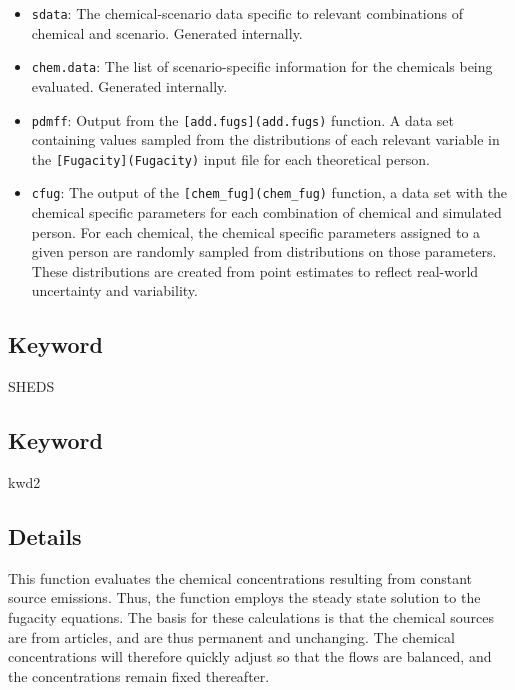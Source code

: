 \documentclass[
]{article}
\providecommand{\tightlist}{%
  \setlength{\itemsep}{0pt}\setlength{\parskip}{0pt}}
\begin{document}
\begin{itemize}
\tightlist
\item
  \texttt{sdata}: The chemical-scenario data specific to relevant
  combinations of chemical and scenario. Generated internally.
\item
  \texttt{chem.data}: The list of scenario-specific information for the
  chemicals being evaluated. Generated internally.
\item
  \texttt{pdmff}: Output from the \texttt{{[}add.fugs{]}(add.fugs)}
  function. A data set containing values sampled from the distributions
  of each relevant variable in the \texttt{{[}Fugacity{]}(Fugacity)}
  input file for each theoretical person.
\item
  \texttt{cfug}: The output of the \texttt{{[}chem\_fug{]}(chem\_fug)}
  function, a data set with the chemical specific parameters for each
  combination of chemical and simulated person. For each chemical, the
  chemical specific parameters assigned to a given person are randomly
  sampled from distributions on those parameters. These distributions
  are created from point estimates to reflect real-world uncertainty and
  variability.
\end{itemize}

\hypertarget{keyword-4}{%
\subsection{Keyword}\label{keyword-4}}

SHEDS

\hypertarget{keyword-5}{%
\subsection{Keyword}\label{keyword-5}}

kwd2

\hypertarget{details-18}{%
\subsection{Details}\label{details-18}}

This function evaluates the chemical concentrations resulting from
constant source emissions. Thus, the function employs the steady state
solution to the fugacity equations. The basis for these calculations is
that the chemical sources are from articles, and are thus permanent and
unchanging. The chemical concentrations will therefore quickly adjust so
that the flows are balanced, and the concentrations remain fixed
thereafter.
\end{document}

